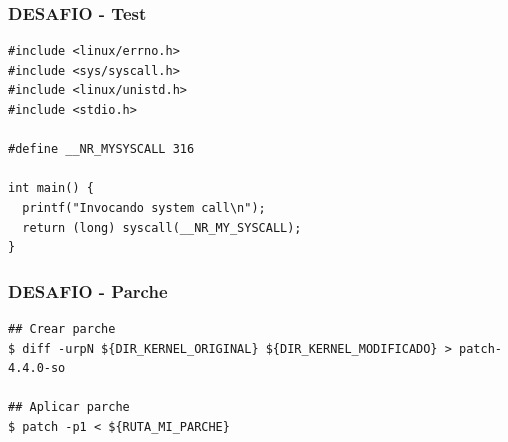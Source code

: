 \begin{frame}[fragile]
\frametitle{DESAFIO - Test}
  \begin{lstlisting}
#include <linux/errno.h>
#include <sys/syscall.h>
#include <linux/unistd.h>
#include <stdio.h>

#define __NR_MYSYSCALL 316

int main() {
  printf("Invocando system call\n");
  return (long) syscall(__NR_MY_SYSCALL);
}
  \end{lstlisting}  
\end{frame}


\begin{frame}[fragile]
\frametitle{DESAFIO - Parche}
  \begin{lstlisting}
## Crear parche
$ diff -urpN ${DIR_KERNEL_ORIGINAL} ${DIR_KERNEL_MODIFICADO} > patch-4.4.0-so

## Aplicar parche
$ patch -p1 < ${RUTA_MI_PARCHE}
  \end{lstlisting}  
\end{frame}

